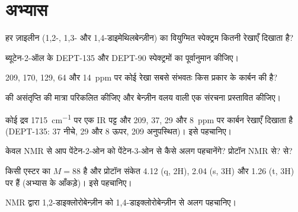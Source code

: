 \section{अभ्यास}

\begin{exercise}[$\star$]\label{exo:b2:structure-determination:1}
हर ज़ाइलीन (1,2-, 1,3- और
1,4-डाइमेथिलबेन्ज़ीन) का वियुग्मित  स्पेक्ट्रम कितनी रेखाएँ दिखाता है?
\end{exercise}

\begin{exercise}[$\star$]\label{exo:b2:structure-determination:2}
ब्यूटेन-2-ऑल के DEPT-135 और DEPT-90 स्पेक्ट्रमों का पूर्वानुमान कीजिए।
\end{exercise}

\begin{exercise}[$\star$]\label{exo:b2:structure-determination:3}
209, 170, 129, 64 और 14~ppm पर कोई रेखा सबसे संभवतः किस प्रकार के कार्बन की है?
\end{exercise}

\begin{exercise}[$\star$]\label{exo:b2:structure-determination:4}
 की असंतृप्ति की मात्रा परिकलित कीजिए और बेन्ज़ीन वलय वाली एक संरचना प्रस्तावित कीजिए।
\end{exercise}

\begin{exercise}[$\star\star$]\label{exo:b2:structure-determination:5}
कोई द्रव  \qty{1715}{cm^{-1}} पर एक IR पट्ट और 209, 37, 29 और 8~ppm पर कार्बन रेखाएँ दिखाता है
(DEPT-135: 37 नीचे, 29 और 8 ऊपर, 209 अनुपस्थित)। इसे पहचानिए।
\end{exercise}

\begin{exercise}[$\star\star$]\label{exo:b2:structure-determination:6}
केवल  NMR से आप पेंटेन-2-ओन को पेंटेन-3-ओन से कैसे अलग पहचानेंगे? प्रोटॉन NMR से?  से?
\end{exercise}

\begin{exercise}[$\star\star$]\label{exo:b2:structure-determination:7}
किसी एस्टर का $M = 88$ है और प्रोटॉन संकेत 4.12 (q, 2H), 2.04 (s, 3H) और 1.26 (t, 3H) पर हैं (अभ्यास के
आँकड़े)। इसे पहचानिए।
\end{exercise}

\begin{exercise}[$\star\star$]\label{exo:b2:structure-determination:8}
 NMR द्वारा 1,2-डाइक्लोरोबेन्ज़ीन को 1,4-डाइक्लोरोबेन्ज़ीन से अलग पहचानिए।
\end{exercise}

